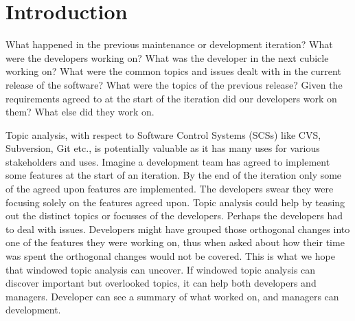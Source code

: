 \documentclass[times, 10pt,twocolumn]{article}
\newcommand{\lda}{Latent Dirichlet Allocation}
\begin{document}
\begin{abstract}

\end{abstract}

\section{Introduction}



% 





What happened in the previous maintenance or development iteration? What were the developers
working on? What was the developer in the next cubicle working on?
What were the common topics and issues dealt with in the current
release of the software? What were the topics of the previous release?
Given the requirements agreed to at the start of the iteration did our
developers work on them? What else did they work on. 

Topic analysis, with respect to Software Control Systems (SCSs) like
CVS, Subversion, Git etc., is potentially valuable as it has many uses
for various stakeholders and uses.
Imagine a
development team has agreed to implement some features at the start of
an iteration. By the end of the iteration only some of the agreed upon
features are implemented. The developers swear they were focusing
solely on the features agreed upon. Topic analysis could help by
teasing out the distinct topics or focusses of the developers. Perhaps
the developers had to deal with issues.
Developers might have grouped those orthogonal changes into
one of the features they were working on, thus when asked about how
their time was spent the orthogonal changes would not be covered. This
is what we hope that windowed topic analysis can uncover. If windowed
topic analysis can discover important but overlooked topics, it can
help both developers and managers. Developer can see a
summary of what worked on, and managers can development.
\end{document}
